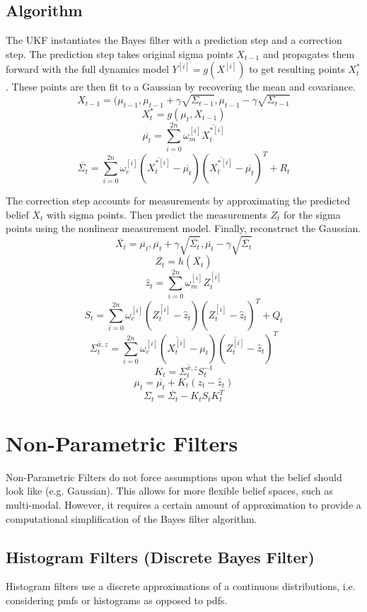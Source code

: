\documentclass[twoside]{article}
\begin{document}
\subsection{Algorithm}\label{sec:ukfalgo}
The UKF instantiates the Bayes filter with a prediction step and a correction step. The prediction step takes original sigma points $X_{t-1}$ and propagates them forward with the full dynamics model $Y^{[i]} = g(X^{[i]})$ to get resulting points $X_{t}^*$. These points are then fit to a Gaussian by recovering the mean and covariance.
$$X_{t-1}=(\mu_{t-1}, \mu_{t-1}+\gamma\sqrt{\Sigma_{t-1}}, \mu_{t-1}-\gamma\sqrt{\Sigma_{t-1}}$$
$$X_{t}^{*} = g(\mu_{t}, X_{t-1})$$
$$\overline{\mu_{t}} = \sum_{i=0}^{2n}\omega_{m}^{[i]}\overline{X_{t}^{*[i]}}$$
$$\overline{\Sigma_{t}} = \sum_{i=0}^{2n} \omega_{c}^{[i]}(\overline{X_{t}^{*[i]}}-\overline{\mu_{t}})(\overline{X_{t}^{*[i]}}-\overline{\mu_{t}})^{T}+R_{t}$$

The correction step accounts for measurements by approximating the predicted belief $X_{t}$ with sigma points. Then predict the measurements $Z_{t}$ for the sigma points using the nonlinear measurement model. Finally, reconstruct the Gaussian.
$$\overline{X_{t}} = \overline{\mu_{t}}, \overline{\mu_{t}}+\gamma\sqrt{\overline{\Sigma_{t}}}, \overline{\mu_{t}}-\gamma\sqrt{\overline{\Sigma_{t}}}$$
$$\overline{Z_{t}} = h(\overline{X_{t}})$$
$$\hat{z}_{t} = \sum_{i=0}^{2n}\omega_{m}^{[i]}\overline{Z_{t}^{[i]}}$$
$$S_{t} = \sum_{i=0}^{2n}\omega_{c}^{[i]}(\overline{Z_{t}^{[i]}} - \hat{z}_{t})(\overline{Z_{t}^{[i]}} - \hat{z}_{t})^{T}+Q_{t}$$
$$\overline{\Sigma_{t}^{x,z}} = \sum_{i=0}^{2n}\omega_{c}^{[i]}(\overline{X_{t}^{[i]}} - \mu_{t})(\overline{Z_{t}^{[i]}} - \hat{z}_{t})^{T}$$
$$K_{t} = \overline{\Sigma_{t}^{x,z}}S_{t}^{-1}$$
$$\mu_{t} = \overline{\mu_{t}}+K_{t}(z_{t} - \hat{z}_{t})$$
$$\Sigma_{t} = \overline{\Sigma_t}-K_{t}S_{t}K_{t}^{T}$$


\section{Non-Parametric Filters}\label{sec:nonparametric}
Non-Parametric Filters do not force assumptions upon what the belief should look like (e.g. Gaussian). This allows for more flexible belief spaces, such as multi-modal. However, it requires a certain amount of approximation to provide a computational simplification of the Bayes filter algorithm.

\subsection{Histogram Filters (Discrete Bayes Filter)}
Histogram filters use a discrete approximations of a continuous distributions, i.e. considering pmfs or histograms as opposed to pdfs.
\end{document}
